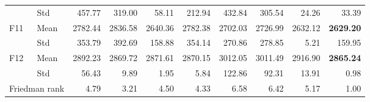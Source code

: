 \begin{tabular}{@{}llrrrrrrrr@{}}
 & Std & 457.77 & 319.00 & 58.11 & 212.94 & 432.84 & 305.54 & 24.26 & 33.39 \\
F11 & Mean & 2782.44 & 2836.58 & 2640.36 & 2782.38 & 2702.03 & 2726.99 & 2632.12 & \textbf{2629.20} \\
 & Std & 353.79 & 392.69 & 158.88 & 354.14 & 270.86 & 278.85 & 5.21 & 159.95 \\
F12 & Mean & 2892.23 & 2869.72 & 2871.61 & 2870.15 & 3012.05 & 3011.49 & 2916.90 & \textbf{2865.24} \\
 & Std & 56.43 & 9.89 & 1.95 & 5.84 & 122.86 & 92.31 & 13.91 & 0.98 \\
\midrule
\multicolumn{2}{l}{Friedman rank} & 4.79 & 3.21 & 4.50 & 4.33 & 6.58 & 6.42 & 5.17 & 1.00 \\
\bottomrule
\end{tabular}

